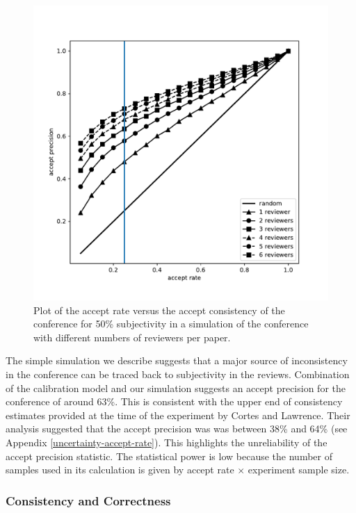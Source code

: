 \documentclass[twoside]{article}
\begin{document}
\begin{figure}[htb]
\includegraphics[width=0.90\columnwidth]{diagrams/neurips/accept-precision-vs-accept-rate.pdf}

\caption{Plot of the accept rate versus the accept consistency of the
  conference for 50\% subjectivity in a simulation of the conference
  with different numbers of reviewers per paper.}
\label{figure-consistency-vs-accept-rate}
\end{figure}

The simple simulation we describe suggests that a major source of inconsistency in the conference can be traced back to subjectivity in the reviews. Combination of the calibration model and our simulation suggests
an accept precision for the conference of around 63\%. This is consistent with the upper end of consistency estimates provided at the time of the experiment by Cortes and Lawrence. Their analysis suggested that the accept precision was was between 38\% and 64\% (see Appendix \ref{uncertainty-accept-rate}). This highlights the unreliability of the accept precision statistic. The statistical power is low because the number of samples used in its calculation is given by accept rate $\times$ experiment sample size.

\subsubsection{Consistency and Correctness}
\end{document}

